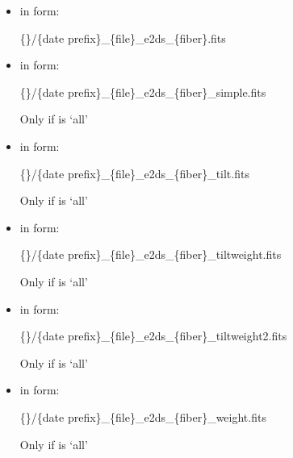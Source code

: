 \begin{itemize}

\item {} in form:
\begin{tcustomdir}
\{\reduceddir\}/\{date prefix\}\_\{file\}\_e2ds\_\{fiber\}.fits
\end{tcustomdir}

\item {} in form:
\begin{tcustomdir}
\{\reduceddir\}/\{date prefix\}\_\{file\}\_e2ds\_\{fiber\}\_simple.fits
\end{tcustomdir}
\begin{note}
Only if  is `all'
\end{note}

\item {} in form:
\begin{tcustomdir}
\{\reduceddir\}/\{date prefix\}\_\{file\}\_e2ds\_\{fiber\}\_tilt.fits
\end{tcustomdir}
\begin{note}
Only if  is `all'
\end{note}

\item {} in form:
\begin{tcustomdir}
\{\reduceddir\}/\{date prefix\}\_\{file\}\_e2ds\_\{fiber\}\_tiltweight.fits
\end{tcustomdir}
\begin{note}
Only if  is `all'
\end{note}

\item {} in form:
\begin{tcustomdir}
\{\reduceddir\}/\{date prefix\}\_\{file\}\_e2ds\_\{fiber\}\_tiltweight2.fits
\end{tcustomdir}
\begin{note}
Only if  is `all'
\end{note}

\item {} in form:
\begin{tcustomdir}
\{\reduceddir\}/\{date prefix\}\_\{file\}\_e2ds\_\{fiber\}\_weight.fits
\end{tcustomdir}
\begin{note}
Only if  is `all'
\end{note}

\end{itemize}


